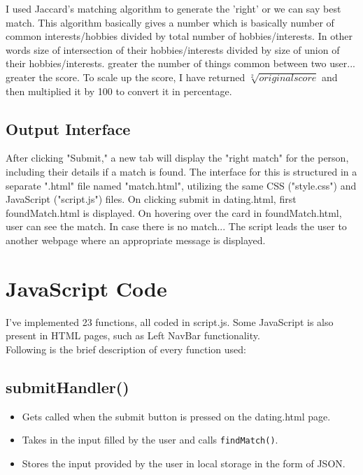 \documentclass[12pt,a4paper]{article}
\begin{document}
I used Jaccard's matching algorithm to generate the 'right' or we can say best match. This algorithm basically gives a number which is basically number of common interests/hobbies divided by total number of hobbies/interests. In other words size of intersection of their hobbies/interests divided by size of union of their hobbies/interests. greater the number of things common between two user... greater the score. To scale up the score, I have returned $\sqrt[2]{ original score}$
and then multiplied it by 100 to convert it in percentage. \\

\subsection{Output Interface}

After clicking "Submit," a new tab will display the "right match" for the person, including their details if a match is found. The interface for this is structured in a separate ".html" file named "match.html", utilizing the same CSS ("style.css") and JavaScript ("script.js") files.
On clicking submit in dating.html, first foundMatch.html is displayed. On hovering over the card in foundMatch.html, user can see the match. In case there is no match... The script leads the user to another webpage where an appropriate message is displayed.

\section{JavaScript Code}
I've implemented 23 functions, all coded in script.js. Some JavaScript is also present in HTML pages, such as Left NavBar functionality.
\\
Following is the brief description of every function used:

\subsection{submitHandler()}
\begin{itemize}
    \item Gets called when the submit button is pressed on the dating.html page.
    \item Takes in the input filled by the user and calls \texttt{findMatch()}.
    \item Stores the input provided by the user in local storage in the form of JSON. 
\end{itemize}
\end{document}
